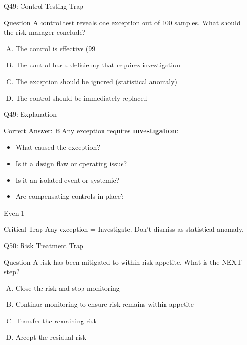 \documentclass{beamer}
\begin{document}
	\begin{frame}{Q49: Control Testing Trap}
		\begin{block}{Question}
			A control test reveals one exception out of 100 samples. What should the risk manager conclude?
		\end{block}
		\begin{enumerate}[(A)]
			\item The control is effective (99%
			\item The control has a deficiency that requires investigation
			\item The exception should be ignored (statistical anomaly)
			\item The control should be immediately replaced
		\end{enumerate}
	\end{frame}
	
	\begin{frame}{Q49: Explanation}
		\begin{block}{Correct Answer: B}
			Any exception requires \textbf{investigation}:
			\begin{itemize}
				\item What caused the exception?
				\item Is it a design flaw or operating issue?
				\item Is it an isolated event or systemic?
				\item Are compensating controls in place?
			\end{itemize}
			Even 1%
		\end{block}
		\begin{alertblock}{Critical Trap}
			Any exception = Investigate.
			Don't dismiss as statistical anomaly.
		\end{alertblock}
	\end{frame}
	
	\begin{frame}{Q50: Risk Treatment Trap}
		\begin{block}{Question}
			A risk has been mitigated to within risk appetite. What is the NEXT step?
		\end{block}
		\begin{enumerate}[(A)]
			\item Close the risk and stop monitoring
			\item Continue monitoring to ensure risk remains within appetite
			\item Transfer the remaining risk
			\item Accept the residual risk
		\end{enumerate}
	\end{frame}
	
\end{document}
